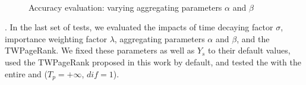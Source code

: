 \newcommand{\graphscaleexpapp}{0.25}
\newcommand{\graphmarginexpapp}{-2ex}
\begin{figure}[tb!]
\addtolength{\subfigcapskip}{-1ex}
\begin{center}
\hfill
{}
\hfill
{}
\\ %
\vspace{-2ex}
\hfill
{}
\hfill
{}
\end{center}
\vspace{-1.5ex}
\caption{\small Accuracy evaluation: varying aggregating parameters $\alpha$ and $\beta$}
\label{exp-ab}
\vspace{-2ex}
\end{figure}

.
In the last set of tests, we evaluated the impacts of time decaying factor $\sigma$, importance weighting factor $\lambda$, aggregating parameters $\alpha$ and $\beta$, and the TWPageRank. We fixed these parameters as well as $Y_s$ to their default values, used the TWPageRank proposed in this work by default, and tested the \PairAcc with the entire \recom and \fcita (\ie $T_p=+\infty$, $dif=1$).

